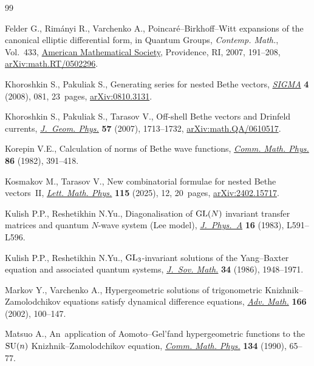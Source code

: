 \documentclass[10pt,a4paper]{amsart}
\numberwithin{equation}{section}
\begin{document}
\begin{thebibliography}{99}
\footnotesize\itemsep=0pt

Felder G., Rim\'anyi R., Varchenko A., Poincar\'e--{B}irkhoff--{W}itt
 expansions of the canonical elliptic differential form, in Quantum Groups,
 \textit{Contemp. Math.}, Vol.~433,
 \href{https://doi.org/10.1090/conm/433/08327}{American Mathematical Society}, Providence, RI, 2007, 191--208,
 \href{http://arxiv.org/abs/math.RT/0502296}{arXiv:math.RT/0502296}.

Khoroshkin S., Pakuliak S., Generating series for nested {B}ethe vectors,
 \href{https://doi.org/10.3842/SIGMA.2008.081}{\textit{SIGMA}} \textbf{4}
 (2008), 081, 23~pages,
 \href{http://arxiv.org/abs/0810.3131}{arXiv:0810.3131}.

Khoroshkin S., Pakuliak S., Tarasov V., Off-shell {B}ethe vectors and
 {D}rinfeld currents,
 \href{https://doi.org/10.1016/j.geomphys.2007.02.005}{\textit{J.~Geom.
 Phys.}} \textbf{57} (2007), 1713--1732,
 \href{http://arxiv.org/abs/math.QA/0610517}{arXiv:math.QA/0610517}.

Korepin V.E., Calculation of norms of {B}ethe wave functions,
 \href{https://doi.org/10.1007/BF01212176}{\textit{Comm. Math. Phys.}}
 \textbf{86} (1982), 391--418.

Kosmakov M., Tarasov V., New combinatorial formulae for nested {B}ethe
 vectors~{II}, \href{https://doi.org/10.1007/s11005-025-01896-2}{\textit{Lett.
 Math. Phys.}} \textbf{115} (2025), 12, 20~pages,
 \href{http://arxiv.org/abs/2402.15717}{arXiv:2402.15717}.

Kulish P.P., Reshetikhin N.Yu., Diagonalisation of {${\rm GL}(N)$} invariant
 transfer matrices and quantum {$N$}-wave system ({L}ee model),
 \href{https://doi.org/10.1088/0305-4470/16/16/001}{\textit{J.~Phys.~A}}
 \textbf{16} (1983), L591--L596.

Kulish P.P., Reshetikhin N.Yu., {${\rm GL}_{3}$}-invariant solutions of the
 {Y}ang--{B}axter equation and associated quantum systems,
 \href{https://doi.org/10.1007/BF01095104}{\textit{J.~Sov. Math.}} \textbf{34}
 (1986), 1948--1971.

Markov Y., Varchenko A., Hypergeometric solutions of trigonometric
 {K}nizhnik--{Z}amolodchikov equations satisfy dynamical difference equations,
 \href{https://doi.org/10.1006/aima.2001.2027}{\textit{Adv. Math.}}
 \textbf{166} (2002), 100--147.

Matsuo A., An~application of {A}omoto--{G}el'fand hypergeometric functions to
 the {${\rm SU}(n)$} {K}nizhnik--{Z}amolodchikov equation,
 \href{https://doi.org/10.1007/BF02102089}{\textit{Comm. Math. Phys.}}
 \textbf{134} (1990), 65--77.


\end{thebibliography}
\end{document}
